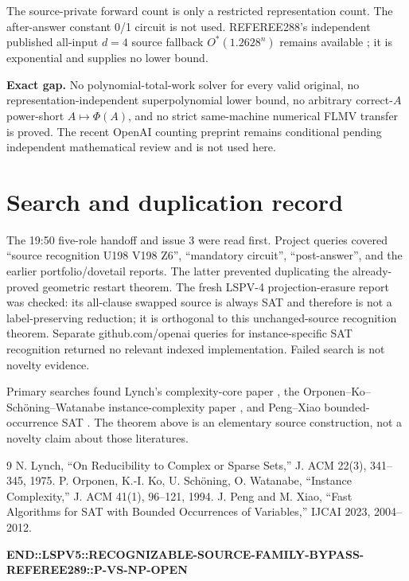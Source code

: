 \documentclass[11pt]{article}
\begin{document}
The source-private forward count is only a restricted representation count.
The after-answer constant 0/1 circuit is not used.  REFEREE288's independent
published all-input $d=4$ source fallback $O^*(1.2628^n)$ remains available
\cite{peng2023}; it is exponential and supplies no lower bound.

\textbf{Exact gap.}  No polynomial-total-work solver for every valid original,
no representation-independent superpolynomial lower bound, no arbitrary
correct-$A$ power-short $A\mapsto\Phi(A)$, and no strict same-machine numerical
FLMV transfer is proved.  The recent OpenAI counting preprint remains
conditional pending independent mathematical review and is not used here.

\section{Search and duplication record}
The 19:50 five-role handoff and issue 3 were read first.  Project queries
covered ``source recognition U198 V198 Z6'', ``mandatory circuit'',
``post-answer'', and the earlier portfolio/dovetail reports.  The latter
prevented duplicating the already-proved geometric restart theorem.  The fresh
LSPV-4 projection-erasure report was checked: its all-clause swapped source is
always SAT and therefore is not a label-preserving reduction; it is orthogonal
to this unchanged-source recognition theorem.  Separate github.com/openai
queries for instance-specific SAT recognition returned no relevant indexed
implementation.  Failed search is not novelty evidence.

Primary searches found Lynch's complexity-core paper
\cite{lynch1975}, the Orponen--Ko--Sch\"oning--Watanabe instance-complexity
paper \cite{orponen1994}, and Peng--Xiao bounded-occurrence SAT
\cite{peng2023}.  The theorem above is an elementary source construction, not
a novelty claim about those literatures.

\begin{thebibliography}{9}
 N. Lynch, ``On Reducibility to Complex or Sparse Sets,''
J. ACM 22(3), 341--345, 1975.
 P. Orponen, K.-I. Ko, U. Sch\"oning, O. Watanabe,
``Instance Complexity,'' J. ACM 41(1), 96--121, 1994.
 J. Peng and M. Xiao, ``Fast Algorithms for SAT with
Bounded Occurrences of Variables,'' IJCAI 2023, 2004--2012.
\end{thebibliography}

\noindent\textbf{END::LSPV5::RECOGNIZABLE-SOURCE-FAMILY-BYPASS-REFEREE289::P-VS-NP-OPEN}
\end{document}
